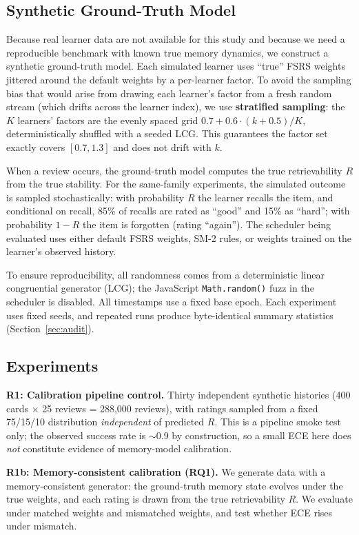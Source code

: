 \documentclass[conference]{IEEEtran}
\begin{document}
\subsection{Synthetic Ground-Truth Model}

Because real learner data are not available for this study and because we need a reproducible benchmark with known true memory dynamics, we construct a synthetic ground-truth model. Each simulated learner uses ``true'' FSRS weights jittered around the default weights by a per-learner factor. To avoid the sampling bias that would arise from drawing each learner's factor from a fresh random stream (which drifts across the learner index), we use \textbf{stratified sampling}: the $K$ learners' factors are the evenly spaced grid $0.7 + 0.6 \cdot (k + 0.5)/K$, deterministically shuffled with a seeded LCG. This guarantees the factor set exactly covers $[0.7, 1.3]$ and does not drift with $k$.

When a review occurs, the ground-truth model computes the true retrievability $R$ from the true stability. For the same-family experiments, the simulated outcome is sampled stochastically: with probability $R$ the learner recalls the item, and conditional on recall, 85\% of recalls are rated as ``good'' and 15\% as ``hard''; with probability $1 - R$ the item is forgotten (rating ``again''). The scheduler being evaluated uses either default FSRS weights, SM-2 rules, or weights trained on the learner's observed history.

To ensure reproducibility, all randomness comes from a deterministic linear congruential generator (LCG); the JavaScript \texttt{Math.random()} fuzz in the scheduler is disabled. All timestamps use a fixed base epoch. Each experiment uses fixed seeds, and repeated runs produce byte-identical summary statistics (Section~\ref{sec:audit}).

\subsection{Experiments}

\textbf{R1: Calibration pipeline control.} Thirty independent synthetic histories (400 cards $\times$ 25 reviews = 288{,}000 reviews), with ratings sampled from a fixed 75/15/10 distribution \emph{independent} of predicted $R$. This is a pipeline smoke test only; the observed success rate is $\sim$0.9 by construction, so a small ECE here does \emph{not} constitute evidence of memory-model calibration.

\textbf{R1b: Memory-consistent calibration (RQ1).} We generate data with a memory-consistent generator: the ground-truth memory state evolves under the true weights, and each rating is drawn from the true retrievability $R$. We evaluate under matched weights and mismatched weights, and test whether ECE rises under mismatch.
\end{document}
